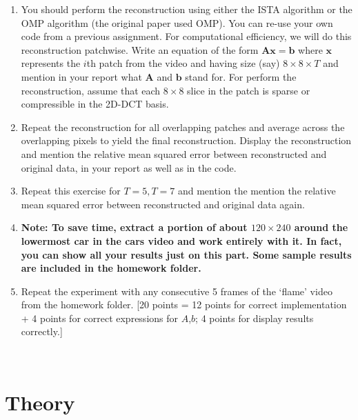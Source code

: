 \documentclass{article}
\begin{document}
\begin{enumerate}
\begin{enumerate}
\item You should perform the reconstruction using either the ISTA algorithm or the OMP algorithm (the original paper used OMP). You can re-use your own code from a previous assignment. For computational efficiency, we will do this reconstruction patchwise. Write an equation of the form $\boldsymbol{Ax} = \boldsymbol{b}$ where $\boldsymbol{x}$ represents the $i$th patch from the video and having size (say) $8 \times 8 \times T$ and mention in your report what $\boldsymbol{A}$ and $\boldsymbol{b}$ stand for. For perform the reconstruction, assume that each $8 \times 8$ slice in the patch is sparse or compressible in the 2D-DCT basis. 
\item Repeat the reconstruction for all overlapping patches and average across the overlapping pixels to yield the final reconstruction. Display the reconstruction and mention the relative mean squared error between reconstructed and original data, in your report as well as in the code. 
\item Repeat this exercise for $T = 5, T = 7$ and mention the mention the relative mean squared error between reconstructed and original data again.
\item \textbf{Note: To save time, extract a portion of about $120 \times 240$ around the lowermost car in the cars video and work entirely with it. In fact, you can show all your results just on this part. Some sample results are included in the homework folder.}
\item Repeat the experiment with any consecutive 5 frames of the `flame' video from the homework folder. 
\textsf{[20 points = 12 points for correct implementation + 4 points for correct expressions for $A$,$b$; 4 points for display results correctly.]}
\end{enumerate}
\\

\newpage

\section{Theory}


\end{enumerate}
\end{document}
